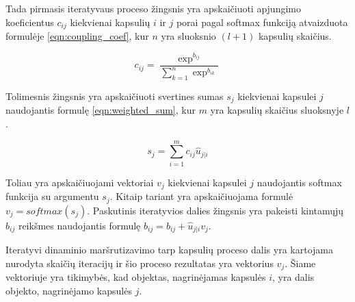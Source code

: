 Tada pirmasis iteratyvaus proceso žingsnis yra apskaičiuoti apjungimo koeficientus $c_{ij}$ kiekvienai kapsulių $i$ ir $j$ porai pagal softmax funkciją atvaizduota formulėje \ref{eqn:coupling_coef}, kur $n$ yra sluoksnio $(l + 1)$ kapsulių skaičius.

\begin{equation}
\label{eqn:coupling_coef}
	c_{ij} = \dfrac{\exp^{b_{ij}}}{\sum_{k = 1}^{n} \exp^{b_{ik}}}
\end{equation}

Tolimesnis žingsnis yra apskaičiuoti svertines sumas $s_j$ kiekvienai kapsulei $j$ naudojantis formulę \ref{eqn:weighted_sum}, kur $m$ yra kapsulių skaičius sluoksnyje $l$.

\begin{equation}
\label{eqn:weighted_sum}
	s_{j} = \sum_{i = 1}^{m} c_{ij} \hat{u}_{j|i}
\end{equation}

Toliau yra apskaičiuojami vektoriai $v_j$ kiekvienai kapsulei $j$ naudojantis softmax funkcija su argumentu $s_j$. Kitaip tariant yra apskaičiuojama formulė $v_j = softmax(s_j)$. Paskutinis iteratyvios dalies žingsnis yra pakeisti kintamųjų $b_{ij}$ reikšmes naudojantis formulę $b_{ij} = b_{ij} + \hat{u}_{j|i} v_j$.

Iteratyvi dinaminio maršrutizavimo tarp kapsulių proceso dalis yra kartojama nurodyta skaičių iteracijų ir šio proceso rezultatas yra vektorius $v_j$. Šiame vektoriuje yra tikimybės, kad objektas, nagrinėjamas kapsulės $i$, yra dalis objekto, nagrinėjamo kapsulės $j$.
